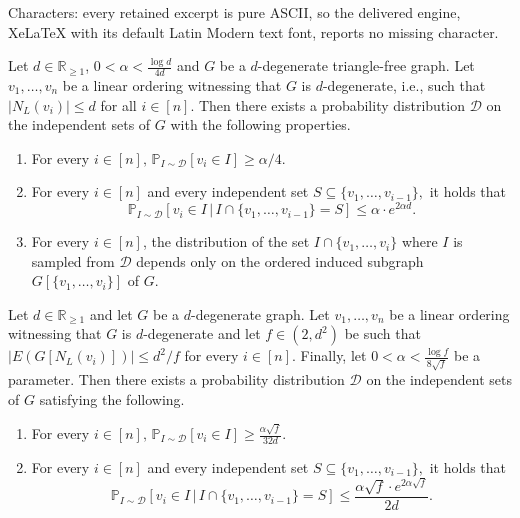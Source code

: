 \documentclass[10pt,a4paper]{amsart}
\newcommand{\calD}{\mathcal{D}}
\renewcommand{\Pr}{\mathbb{P}}
\begin{document}
Characters: every retained excerpt is pure ASCII, so the delivered engine, XeLaTeX with its default Latin Modern text font, reports no missing character.
\begin{lemma} \label{lem:main}
    Let $d\in \mathbb{R}_{\ge 1}$, $0 < \alpha < \frac{\log d}{4d}$ and $G$ be a $d$-degenerate triangle-free graph. Let $v_1,\ldots,v_n$ be a linear ordering witnessing that $G$ is $d$-degenerate, i.e., such that $|N_L(v_i)|\le d$ for all $i\in [n]$. Then there exists a probability distribution $\mathcal{D}$ on the independent sets of $G$ with the following properties.

    \begin{enumerate}[label=\alph*)]
        \item \label{prop:large-prob} For every $i \in [n], \, \Pr_{I \sim \calD}[v_i \in I] \ge \alpha / 4.$
        \item \label{prop:prob-not-too-big} For every $i \in [n]$ and every independent set $S \subseteq \{v_1, \dots, v_{i-1}\},$ it holds that
        \[ \Pr_{I \sim \calD}[v_i \in I \, \vert \, I \cap \{v_1, \dots, v_{i-1}\} = S] \le \alpha \cdot e^{2 \alpha d}. \]
        \item \label{prop:indepofwhatcomesafter} For every $i\in [n]$, the distribution of the set $I\cap \{v_1,\ldots,v_i\}$ where $I$ is sampled from $\mathcal{D}$ depends only on the ordered induced subgraph $G[\{v_1,\ldots,v_{i}\}]$ of $G$.
    \end{enumerate}
\end{lemma}

\begin{corollary} \label{cor:sparseleft}
    Let $d\in \mathbb{R}_{\ge 1}$ and let $G$ be a $d$-degenerate graph. Let $v_1,\ldots,v_n$ be a linear ordering witnessing that $G$ is $d$-degenerate and let $f\in (2,d^2)$ be such that $|E(G[N_L(v_i)])|\le d^2/f$ for every $i \in [n]$. Finally, let $0<\alpha<\frac{\log f}{8\sqrt{f}}$ be a parameter. Then there exists a probability distribution $\mathcal{D}$ on the independent sets of $G$ satisfying the following.

    \begin{enumerate}[label=\alph*)]
        \item \label{prop:large-prob2} For every $i \in [n], \, \Pr_{I \sim \calD}[v_i \in I] \ge \frac{\alpha\sqrt{f}}{32 d}.$
        \item \label{prop:prob-not-too-big2} For every $i \in [n]$ and every independent set $S \subseteq \{v_1, \dots, v_{i-1}\},$ it holds that
        \[ \Pr_{I \sim \calD}[v_i \in I \, \vert \, I \cap \{v_1, \dots, v_{i-1}\} = S] \le \frac{\alpha\sqrt{f} \cdot e^{2 \alpha \sqrt{f}}}{2d}. \]
    \end{enumerate}
    \end{corollary}
\end{document}
